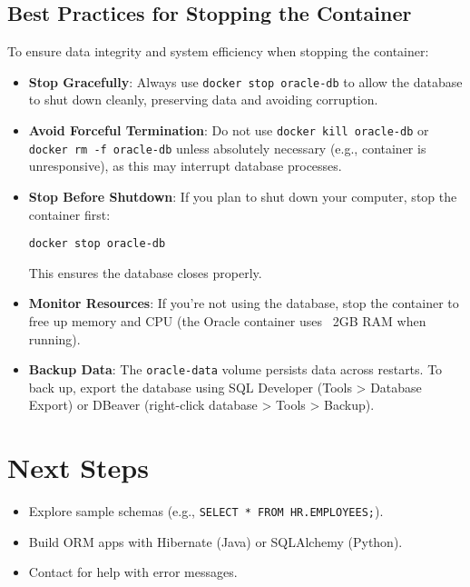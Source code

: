 \documentclass[a4paper,12pt]{article}
\begin{document}
\subsection{Best Practices for Stopping the Container}
To ensure data integrity and system efficiency when stopping the container:
\begin{itemize}
  \item \textbf{Stop Gracefully}: Always use \texttt{docker stop oracle-db} to allow the database to shut down cleanly, preserving data and avoiding corruption.
  \item \textbf{Avoid Forceful Termination}: Do not use \texttt{docker kill oracle-db} or \texttt{docker rm -f oracle-db} unless absolutely necessary (e.g., container is unresponsive), as this may interrupt database processes.
  \item \textbf{Stop Before Shutdown}: If you plan to shut down your computer, stop the container first:
    \begin{lstlisting}
docker stop oracle-db
    \end{lstlisting}
    This ensures the database closes properly.
  \item \textbf{Monitor Resources}: If you’re not using the database, stop the container to free up memory and CPU (the Oracle container uses ~2GB RAM when running).
  \item \textbf{Backup Data}: The \texttt{oracle-data} volume persists data across restarts. To back up, export the database using SQL Developer (Tools > Database Export) or DBeaver (right-click database > Tools > Backup).
\end{itemize}

\section{Next Steps}
\begin{itemize}
  \item Explore sample schemas (e.g., \texttt{SELECT * FROM HR.EMPLOYEES;}).
  \item Build ORM apps with Hibernate (Java) or SQLAlchemy (Python).
  \item Contact for help with error messages.
\end{itemize}
\end{document}

